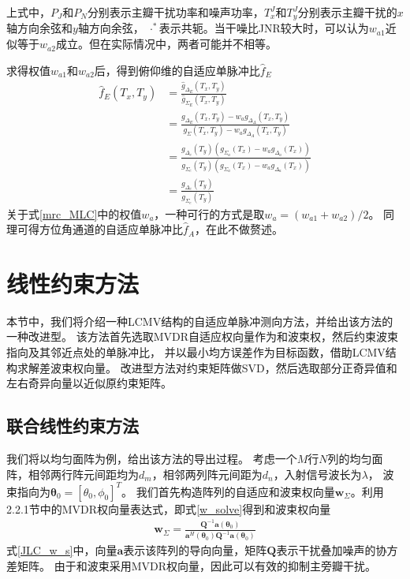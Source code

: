 \documentclass[master]{thesis-uestc}
\begin{document}
上式中，$P_J$和$P_N$分别表示主瓣干扰功率和噪声功率，$T_x^J$和$T_y^J$分别表示主瓣干扰的$x$轴方向余弦和$y$轴方向余弦，
$\cdot^*$表示共轭。当干噪比JNR较大时，可以认为$w_{a1}$近似等于$w_{a2}$成立。但在实际情况中，两者可能并不相等。

求得权值$w_{a1}$和$w_{a2}$后，得到俯仰维的自适应单脉冲比$\hat{f}_E$
\begin{equation}\label{mrc_MLC}
    \begin{aligned}
        \hat{f}_{E}\left(T_{x}, T_{y}\right) &=
        \frac{\hat{g}_{\Delta_{E}}\left(T_{x}, T_{y}\right)}{\hat{g}_{\Sigma_{E}}\left(T_{x}, T_{y}\right)} \\
        &=\frac{g_{\Delta_{E}}\left(T_{x}, T_{y}\right)-w_{a} g_{\Delta_{\Delta}}\left(T_{x}, T_{y}\right)}
        {g_{\Sigma}\left(T_{x}, T_{y}\right)-w_{a} g_{\Delta_{A}}\left(T_{x}, T_{y}\right)} \\
        &=\frac{g_{\Delta_{e}}\left(T_{y}\right)
        \left(g_{\Sigma_{a}}\left(T_{x}\right)-w_{a} g_{\Delta_{a}}\left(T_{x}\right)\right)}
        {g_{\Sigma_{e}}\left(T_{y}\right)
        \left(g_{\Sigma_{a}}\left(T_{x}\right)-w_{a} g_{\Delta_{a}}\left(T_{x}\right)\right)} \\
        &=\frac{g_{\Delta_{e}}\left(T_{y}\right)}{g_{\Sigma_{e}}\left(T_{y}\right)}
        \end{aligned}
\end{equation}
关于式\eqref{mrc_MLC}中的权值$w_a$，一种可行的方式是取$w_a=(w_{a1}+w_{a2})/2$。
同理可得方位角通道的自适应单脉冲比$\hat{f}_A$，在此不做赘述。

\section{线性约束方法}
本节中，我们将介绍一种LCMV结构的自适应单脉冲测向方法，并给出该方法的一种改进型。
该方法首先选取MVDR自适应权向量作为和波束权，然后约束波束指向及其邻近点处的单脉冲比，
并以最小均方误差作为目标函数，借助LCMV结构求解差波束权向量。
改进型方法对约束矩阵做SVD，然后选取部分正奇异值和左右奇异向量以近似原约束矩阵。

\subsection{联合线性约束方法}
我们将以均匀面阵为例，给出该方法的导出过程。
考虑一个$M$行$N$列的均匀面阵，相邻两行阵元间距均为$d_m$，相邻两列阵元间距为$d_n$，入射信号波长为$\lambda$，
波束指向为$\bm{\theta}_0=\left[\theta_0,\phi_0\right]^T$。
我们首先构造阵列的自适应和波束权向量$\bm{w}_\Sigma$。利用2.2.1节中的MVDR权向量表达式，即式\eqref{w_solve}得到和波束权向量
\begin{equation}\label{JLC_w_s}
    \begin{aligned}
        \bm{w}_\Sigma = \frac{\bm{Q}^{-1}\bm{a}(\bm{\theta}_0)}{\bm{a}^H(\bm{\theta}_0)\bm{Q}^{-1}\bm{a}(\bm{\theta}_0)}
    \end{aligned}
\end{equation}
式\eqref{JLC_w_s}中，向量$\bm{a}$表示该阵列的导向向量，矩阵$\bm{Q}$表示干扰叠加噪声的协方差矩阵。
由于和波束采用MVDR权向量，因此可以有效的抑制主旁瓣干扰。
\end{document}
